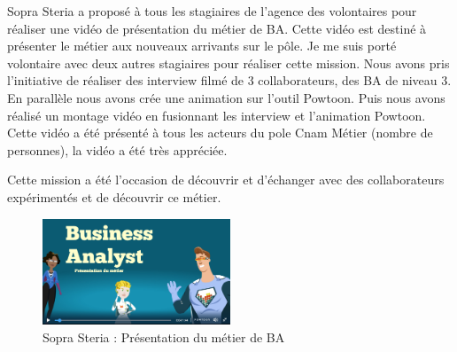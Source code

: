 Sopra Steria a proposé à tous les stagiaires de l'agence des volontaires pour réaliser une vidéo de présentation du métier de BA. Cette vidéo est destiné à présenter le métier aux nouveaux arrivants sur le pôle.
Je me suis porté volontaire avec deux autres stagiaires pour réaliser cette mission. 
Nous avons pris l'initiative de réaliser des interview filmé de 3 collaborateurs, des BA de niveau 3. 
En parallèle nous avons crée une animation sur l'outil Powtoon. Puis nous avons réalisé un montage vidéo en fusionnant les interview et l'animation Powtoon.
Cette vidéo a été présenté à tous les acteurs du pole Cnam Métier (nombre de personnes), la vidéo a été très appréciée.

Cette mission a été l'occasion de découvrir et d'échanger avec des collaborateurs expérimentés et de découvrir ce métier.

\begin{figure}[!h]
\centering
\includegraphics[width=0.5\textwidth]{images/presBA.png}
\caption{Sopra Steria : Présentation du métier de BA}
\end{figure}
